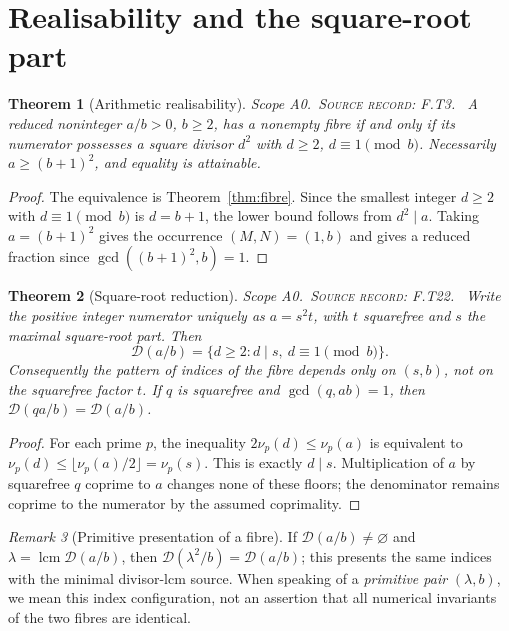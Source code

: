 \documentclass[11pt,oneside,openany]{book}
\newtheorem{theorem}{Theorem}[chapter]
\theoremstyle{definition}
\theoremstyle{remark}
\newtheorem{remark}[theorem]{Remark}
\newcommand{\Dx}{\mathcal{D}}
\newcommand{\lcmop}{\operatorname{lcm}}
\newcommand{\gcdop}{\operatorname{gcd}}
\newcommand{\scope}[1]{\textsf{\small Scope #1.}\ }
\newcommand{\record}[1]{\textup{\textsc{Source record: #1.}}\ }
\begin{document}
\section{Realisability and the square-root part}
\begin{theorem}[Arithmetic realisability]\label{thm:real}
\scope{A0}\record{F.T3} A reduced noninteger \(a/b>0\), \(b\ge2\), has a nonempty fibre if and only if its numerator possesses a square divisor \(d^2\) with \(d\ge2\), \(d\equiv1\pmod b\). Necessarily \(a\ge(b+1)^2\), and equality is attainable.
\end{theorem}
\begin{proof}
The equivalence is Theorem~\ref{thm:fibre}. Since the smallest integer \(d\ge2\) with \(d\equiv1\pmod b\) is \(d=b+1\), the lower bound follows from \(d^2\mid a\). Taking \(a=(b+1)^2\) gives the occurrence \((M,N)=(1,b)\) and gives a reduced fraction since \(\gcdop((b+1)^2,b)=1\).
\end{proof}

\begin{theorem}[Square-root reduction]\label{thm:sqrtpart}
\scope{A0}\record{F.T22} Write the positive integer numerator uniquely as \(a=s^2t\), with \(t\) squarefree and \(s\) the maximal square-root part. Then
\begin{equation}\label{eq:root}
 \Dx(a/b)=\{d\ge2:d\mid s,\ d\equiv1\pmod b\}.
\end{equation}
Consequently the pattern of indices of the fibre depends only on \((s,b)\), not on the squarefree factor \(t\). If \(q\) is squarefree and \(\gcdop(q,ab)=1\), then \(\Dx(qa/b)=\Dx(a/b)\).
\end{theorem}
\begin{proof}
For each prime \(p\), the inequality \(2\nu_p(d)\le\nu_p(a)\) is equivalent to \(\nu_p(d)\le\lfloor\nu_p(a)/2\rfloor=\nu_p(s)\). This is exactly \(d\mid s\). Multiplication of \(a\) by squarefree \(q\) coprime to \(a\) changes none of these floors; the denominator remains coprime to the numerator by the assumed coprimality.
\end{proof}

\begin{remark}[Primitive presentation of a fibre]
If \(\Dx(a/b)\ne\varnothing\) and \(\lambda=\lcmop\Dx(a/b)\), then \(\Dx(\lambda^2/b)=\Dx(a/b)\); this presents the same indices with the minimal divisor-lcm source. When speaking of a \emph{primitive pair} \((\lambda,b)\), we mean this index configuration, not an assertion that all numerical invariants of the two fibres are identical.
\end{remark}
\end{document}
